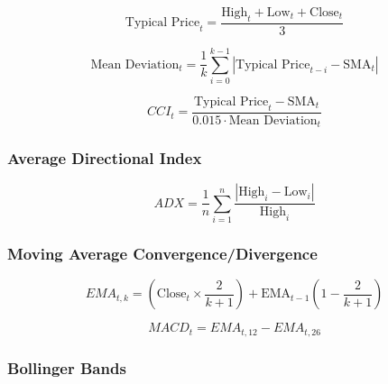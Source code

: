 \documentclass[journal]{new-aiaa}
\begin{document}
\begin{equation}\label{eq:Typical_Price}
        \text{Typical Price}_t = \frac{\text{High}_{t} + \text{Low}_{t} + \text{Close}_{t}}{3}
\end{equation}

\begin{equation}\label{eq:Mean_Deviation}
        \text{Mean Deviation}_t = \frac{1}{k} \sum_{i=0}^{k-1} \left|\text{Typical Price}_{t-i} - \text{SMA}_t\right|
\end{equation}

\begin{equation}\label{eq:Commodity_Channel_Index}
        CCI_t =  \frac{\text{Typical Price}_t - \text{SMA}_{t}}{0.015 \cdot \text{Mean Deviation}_{t}}
\end{equation}

\subsubsection{Average Directional Index}\label{sec:Technical_Analysis:Average_Directional_Index}

\cite{wilder1978new}

\begin{equation}\label{eq:Average_Directional_Index}
        ADX = \frac{1}{n} \sum_{i=1}^{n} \frac{\left| \text{High}_i - \text{Low}_i \right|}{\text{High}_i}
\end{equation}

\subsubsection{Moving Average Convergence/Divergence}\label{sec:Technical_Analysis:Moving_Average_Convergence_Divergence}

\cite{appel2005technical}

\begin{equation}\label{eq:Exponential_Moving_Average}
        EMA_{t,k} = \left(\text{Close}_{t} \times \frac{2}{k+1}\right) + \text{EMA}_{t-1} \left(1 - \frac{2}{k+1}\right)
\end{equation}

\begin{equation}\label{eq:Moving_Average_Convergence_Divergence}
        MACD_t = EMA_{t,12} - EMA_{t,26}
\end{equation}

\subsubsection{Bollinger Bands}\label{sec:Technical_Analysis:Bollinger_Bands}
\end{document}
